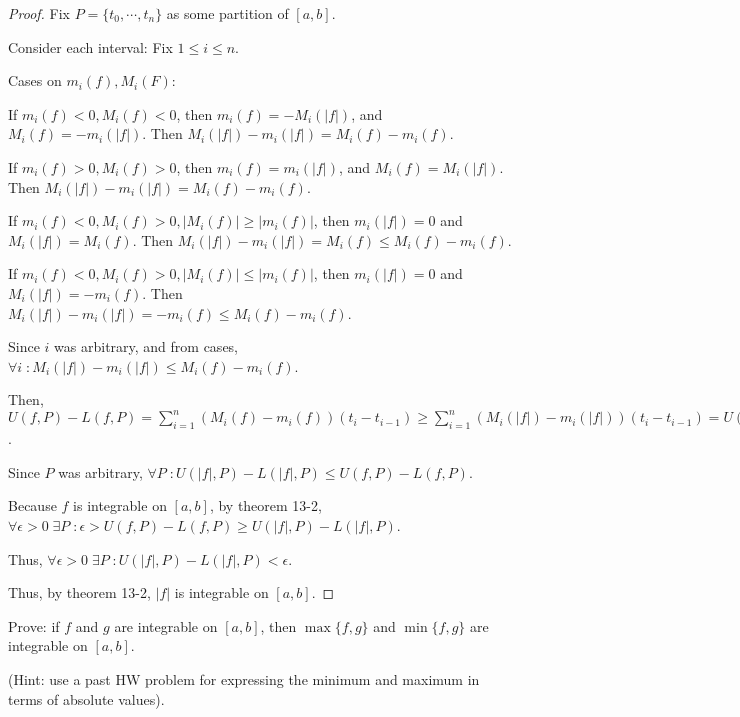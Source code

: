 \documentclass{article} %
\theoremstyle{plain}
\theoremstyle{definition}
\begin{document}
\begin{proof}
    Fix $P = \{t_0, \cdots, t_n\}$ as some partition of $[a,b]$.

    Consider each interval: Fix $1 \leq i \leq n$.

    Cases on $m_i(f), M_i(F)$:

    If $m_i(f) < 0, M_i(f) < 0$, then $m_i(f) = - M_i(|f|)$, and $M_i(f) = - m_i(|f|)$.  Then $M_i(|f|) - m_i(|f|) = M_i(f) - m_i(f)$.

    If $m_i(f) > 0, M_i(f) > 0$, then $m_i(f) = m_i(|f|)$, and $M_i(f) = M_i(|f|)$.  Then $M_i(|f|) - m_i(|f|) = M_i(f) - m_i(f)$.

    If $m_i(f) < 0, M_i(f) > 0, |M_i(f)| \geq |m_i(f)|$, then $m_i(|f|) = 0$ and $M_i(|f|) = M_i(f)$.  Then $M_i(|f|) - m_i(|f|) = M_i(f) \leq M_i(f) - m_i(f)$.

    If $m_i(f) < 0, M_i(f) > 0, |M_i(f)| \leq |m_i(f)|$, then $m_i(|f|) = 0$ and $M_i(|f|) = -m_i(f)$.  Then $M_i(|f|) - m_i(|f|) = -m_i(f) \leq M_i(f) - m_i(f)$.

    Since $i$ was arbitrary, and from cases, $\forall i \; \colon M_i(|f|) - m_i(|f|) \leq M_i(f) - m_i(f)$.

    Then, $U(f,P) - L(f,P) = \sum_{i=1}^{n} (M_i(f) - m_i(f))(t_i - t_{i-1}) \geq \sum_{i=1}^{n} (M_i(|f|) - m_i(|f|))(t_i - t_{i-1}) = U(|f|, P) - L(|f|, P)$.

    Since $P$ was arbitrary, $\forall P \; \colon U(|f|,P) - L(|f|,P) \leq U(f,P) - L(f,P)$.

    Because $f$ is integrable on $[a,b]$, by theorem 13-2, $\forall \epsilon > 0 \; \exists P \; \colon \epsilon > U(f,P) - L(f,P) \geq U(|f|, P) - L(|f|,P)$.

    Thus, $\forall \epsilon > 0 \; \exists P \; \colon U(|f|,P) - L(|f|,P) < \epsilon$.

    Thus, by theorem 13-2, $|f|$ is integrable on $[a,b]$.
\end{proof}


\noindent{} Prove: if $f$ and $g$ are integrable on $[a,b]$, then $\max\{f,g\}$ and $\min\{f,g\}$ are integrable on $[a,b]$. 

(Hint: use a past HW problem for expressing the minimum and maximum in terms of absolute values). 
\end{document}
